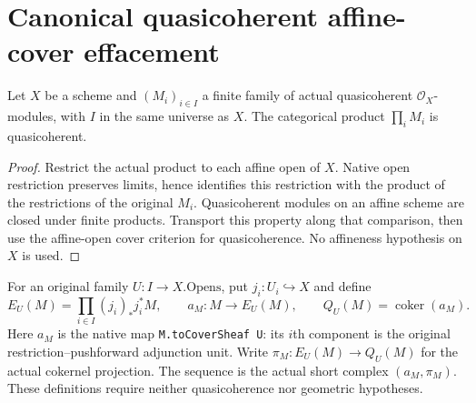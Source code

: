 \section{Canonical quasicoherent affine-cover effacement}

\begin{lemma}
\label{lem:scheme-quasicoherent-finite-product}
\leanok
Let $X$ be a scheme and $(M_i)_{i\in I}$ a finite family of actual
quasicoherent $\mathcal O_X$-modules, with $I$ in the same universe as
$X$. The categorical product $\prod_i M_i$ is quasicoherent.
\end{lemma}
\begin{proof}
Restrict the actual product to each affine open of $X$. Native open
restriction preserves limits, hence identifies this restriction with
the product of the restrictions of the original $M_i$. Quasicoherent
modules on an affine scheme are closed under finite products. Transport
this property along that comparison, then use the affine-open cover
criterion for quasicoherence. No affineness hypothesis on $X$ is used.
\end{proof}

\begin{definition}
\label{def:scheme-canonical-affine-effacement}
\leanok
For an original family $U:I\to X.\mathrm{Opens}$, put $j_i:U_i\hookrightarrow X$
and define
\[
 E_U(M)=\prod_{i\in I}(j_i)_*j_i^*M,\qquad
 a_M:M\longrightarrow E_U(M),\qquad Q_U(M)=\operatorname{coker}(a_M).
\]
Here $a_M$ is the native map \texttt{M.toCoverSheaf U}: its $i$th
component is the original restriction--pushforward adjunction unit.
Write $\pi_M:E_U(M)\to Q_U(M)$ for the actual cokernel projection.
The sequence is the actual short complex $(a_M,\pi_M)$.
These definitions require neither quasicoherence nor geometric hypotheses.
\end{definition}

